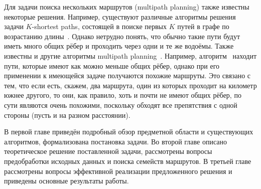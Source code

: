 Для задачи поиска нескольких маршрутов (multipath planning) также
известны некоторые решения. Например, существуют различные алгоритмы
решения задачи $K$-shortest paths, состоящей в поиске первых $K$ путей
в графе по возрастанию длины~\cite{eppstein1998finding,
yen1971finding}. Однако нетрудно понять, что обычно такие пути будут
иметь много общих рёбер и проходить через одни и те же водоёмы. Также
известны и другие алгоритмы multipath planning~\cite{lim2005shortest,
dial1971probabilistic, mafast}. Например,
алгоритм~\cite{lim2005shortest} находит пути, которые имеют как можно
меньше общих рёбер, однако при его применении к имеющейся задаче
получаются похожие маршруты. Это связано с тем, что если есть, скажем,
два маршрута, один из которых проходит на километр южнее другого, то
они, как правило, хоть и почти не имеют общих рёбер, по сути являются
очень похожими, поскольку обходят все препятствия с одной стороны
(пусть и на разном расстоянии).

В первой главе приведён подробный обзор предметной области и
существующих алгоритмов, формализована постановка задачи.
Во второй главе описано теоретическое решение поставленной задачи,
рассмотрены вопросы предобработки исходных данных и поиска семейств
маршрутов. В третьей главе рассмотрены вопросы эффективной реализации
предложенного решения и приведены основные результаты работы.

\FloatBarrier

